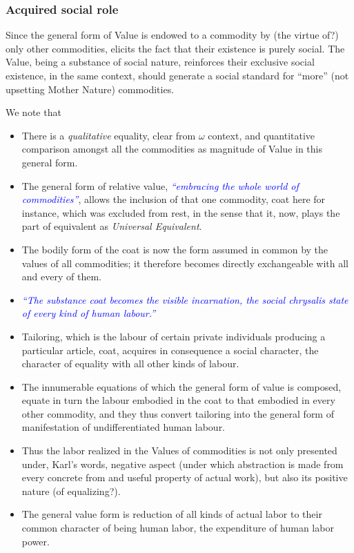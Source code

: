 \documentclass[12pt]{extarticle}
\theoremstyle{definition}
\newenvironment{remark}[1][Remark]{\begin{trivlist}
\item[\hskip \labelsep {\bfseries #1}]}{\end{trivlist}}
\begin{document}
  \subsubsection{Acquired social role}
  Since the general form of Value is endowed to a commodity by (the virtue of?) only other commodities, elicits the fact that their existence is purely social. The Value, being a substance of social nature, reinforces their exclusive social existence, in the same context, should generate a social standard for ``more'' (not upsetting Mother Nature) commodities.

  \begin{remark}
    We note that
    \begin{itemize}
    \item There is a \emph{qualitative} equality, clear from $\omega$ context, and quantitative comparison amongst all the commodities as magnitude of Value in this general form.
    \item The general form of relative value, \emph{\textcolor{blue}{``embracing the whole world of commodities''}}, allows the inclusion of that one commodity, coat here for instance, which was excluded from rest, in the sense that it, now, plays the part of equivalent as \emph{Universal Equivalent}.
    \item The bodily form of the coat is now the form assumed in common by the values of all commodities; it therefore becomes directly exchangeable with all and every of them.
      \item \emph{\textcolor{blue}{``The substance coat becomes the visible incarnation, the social chrysalis state
            of every kind of human labour.''}}
        \item Tailoring, which is the labour of certain private individuals
producing a particular article, coat, acquires in consequence a social character, the character of
equality with all other kinds of labour.
\item The innumerable equations of which the general form of
value is composed, equate in turn the labour embodied in the coat to that embodied in every
other commodity, and they thus convert tailoring into the general form of manifestation of
undifferentiated human labour.
\item Thus the labor realized in the Values of commodities is not only presented under, Karl's words, negative aspect (under which abstraction is made from every concrete from and useful property of actual work), but also its positive nature (of equalizing?).
  \item The general value form is reduction of all kinds of actual labor to their common character of being human labor, the expenditure of human labor power.
    \end{itemize}
  \end{remark}
  
\end{document}
